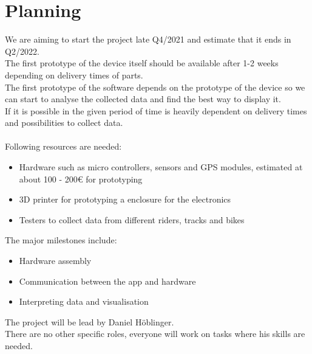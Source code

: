 \documentclass[12pt]{article}
\theoremstyle{definition}
\begin{document}
\pagebreak
\section{Planning}
We are aiming to start the project late Q4/2021 and estimate that it ends in Q2/2022.\\
The first prototype of the device itself should be available after 1-2 weeks depending on delivery times of parts.\\
The first prototype of the software depends on the prototype of the device so we can start to analyse the collected data and find the best way to display it.\\
If it is possible in the given period of time is heavily dependent on delivery times and possibilities to collect data.\\
\\
Following resources are needed: 
\begin{itemize}
\item Hardware such as micro controllers, sensors and GPS modules, estimated at about 100 - 200€ for prototyping
\item 3D printer for prototyping a enclosure for the electronics
\item Testers to collect data from different riders, tracks and bikes
\end{itemize}
The major milestones include:
\begin{itemize}
    \item Hardware assembly
    \item Communication between the app and hardware
    \item Interpreting data and visualisation
\end{itemize}
The project will be lead by Daniel Höblinger.\\
There are no other specific roles, everyone will work on tasks where his skills are needed.
\end{document}

